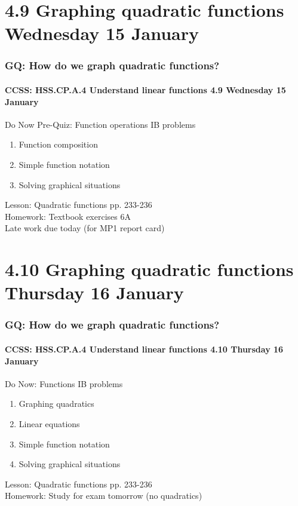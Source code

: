 \documentclass{beamer}
\begin{document}
\section{4.9 Graphing quadratic functions Wednesday 15 January}
\frame
{
  \frametitle{GQ: How do we graph quadratic functions?}
  \framesubtitle{CCSS: HSS.CP.A.4 Understand linear functions \hfill \alert{4.9 Wednesday 15 January}}

  \begin{block}{Do Now Pre-Quiz: Function operations IB problems}
  \begin{enumerate}
    \item Function composition
    \item Simple function notation
    \item Solving graphical situations
  \end{enumerate}
  \end{block}
  Lesson: Quadratic functions pp. 233-236 \\ \smallskip
  Homework: Textbook exercises 6A \\
  \alert{Late work due today (for MP1 report card)}
}

\section{4.10 Graphing quadratic functions Thursday 16 January}
\frame
{
  \frametitle{GQ: How do we graph quadratic functions?}
  \framesubtitle{CCSS: HSS.CP.A.4 Understand linear functions \hfill \alert{4.10  Thursday 16  January}}

  \begin{block}{Do Now: Functions IB problems}
  \begin{enumerate}
    \item Graphing quadratics
    \item Linear equations
    \item Simple function notation
    \item Solving graphical situations
  \end{enumerate}
  \end{block}
  Lesson: Quadratic functions pp. 233-236 \\ \smallskip
  Homework: Study for \alert{exam tomorrow} (no quadratics)
}
\end{document}
